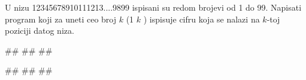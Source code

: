 \begin{Exercise}[label=p1.2_03] 
 U nizu 12345678910111213....9899 ispisani su redom brojevi od 1 do 99. Napisati program koji za uneti  ceo broj $k$ (1 \geq $k$ ) ispisuje cifru koja se nalazi na $k$-toj poziciji datog niza.
 
\begin{miditest}
\begin{upotreba}{1}
#\naslovInt#
##
##
\end{upotreba}
\end{miditest}
\begin{miditest}
\begin{upotreba}{2}
#\naslovInt#
##
##
\end{upotreba}
\end{miditest}

\end{Exercise}
\begin{Answer}[ref=p1.2_03]
\end{Answer}


